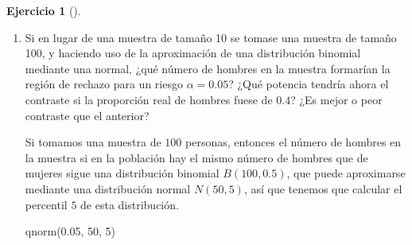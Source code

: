 \documentclass[
  a4paper,
]{scrreport}
\newenvironment{Shaded}{\begin{snugshade}}{\end{snugshade}}
\newcommand{\DecValTok}[1]{\textcolor[rgb]{0.68,0.00,0.00}{#1}}
\newcommand{\FloatTok}[1]{\textcolor[rgb]{0.68,0.00,0.00}{#1}}
\newcommand{\FunctionTok}[1]{\textcolor[rgb]{0.28,0.35,0.67}{#1}}
\newcommand{\NormalTok}[1]{\textcolor[rgb]{0.00,0.23,0.31}{#1}}
\theoremstyle{definition}
\newtheorem{exercise}{Ejercicio}[chapter]
\theoremstyle{remark}
\begin{document}
\begin{exercise}[]
\begin{enumerate}
\begin{tcolorbox}
  Tenemos que calcular la probabilidad de haya \(1\) o menos hombres con
  la distribución \(B(10, 0.4)\).

\begin{Shaded}
\begin{Highlighting}[]
\FunctionTok{pbinom}\NormalTok{(}\DecValTok{1}\NormalTok{, }\DecValTok{10}\NormalTok{, }\FloatTok{0.4}\NormalTok{)}
\end{Highlighting}
\end{Shaded}

\begin{verbatim}
[1] 0.0463574
\end{verbatim}

  La potencia del contraste suponiendo que la proporción real de hombres
  en la población es \(0.4\), es \(0.0464\) que es muy baja.

  \end{tcolorbox}
\item
  Si en lugar de una muestra de tamaño 10 se tomase una muestra de
  tamaño 100, y haciendo uso de la aproximación de una distribución
  binomial mediante una normal, ¿qué número de hombres en la muestra
  formarían la región de rechazo para un riesgo \(\alpha=0.05\)? ¿Qué
  potencia tendría ahora el contraste si la proporción real de hombres
  fuese de \(0.4\)? ¿Es mejor o peor contraste que el anterior?

  \begin{tcolorbox}[enhanced jigsaw, colframe=quarto-callout-tip-color-frame, toprule=.15mm, bottomtitle=1mm, breakable, opacitybacktitle=0.6, toptitle=1mm, colback=white, bottomrule=.15mm, title=\textcolor{quarto-callout-tip-color}{\faLightbulb}\hspace{0.5em}{Solución}, arc=.35mm, left=2mm, titlerule=0mm, rightrule=.15mm, coltitle=black, leftrule=.75mm, opacityback=0, colbacktitle=quarto-callout-tip-color!10!white]

  Si tomamos una muestra de \(100\) personas, entonces el número de
  hombres en la muestra si en la población hay el mismo número de
  hombres que de mujeres sigue una distribución binomial \(B(100,0.5)\),
  que puede aproximarse mediante una distribución normal \(N(50,5)\),
  así que tenemos que calcular el percentil \(5\) de esta distribución.

\begin{Shaded}
\begin{Highlighting}[]
\FunctionTok{qnorm}\NormalTok{(}\FloatTok{0.05}\NormalTok{, }\DecValTok{50}\NormalTok{, }\DecValTok{5}\NormalTok{)}
\end{Highlighting}
\end{Shaded}


\end{tcolorbox}
\end{enumerate}
\end{exercise}
\end{document}
